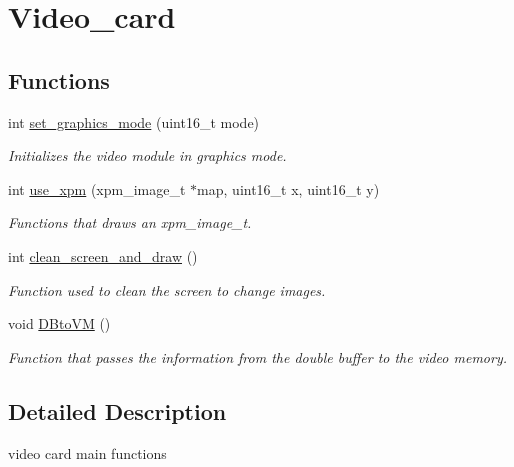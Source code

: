\hypertarget{group__video__card}{}\section{Video\+\_\+card}
\label{group__video__card}
\subsection*{Functions}
\begin{DoxyCompactItemize}
\item 
int \hyperlink{group__video__card_ga430711ee8dd8b9944c9393b6f333f48d}{set\+\_\+graphics\+\_\+mode} (uint16\+\_\+t mode)
\begin{DoxyCompactList}\small\item\em Initializes the video module in graphics mode. \end{DoxyCompactList}\item 
int \hyperlink{group__video__card_gacfacfc0ba6b20cfe99f211e93870bc4c}{use\+\_\+xpm} (xpm\+\_\+image\+\_\+t $\ast$map, uint16\+\_\+t x, uint16\+\_\+t y)
\begin{DoxyCompactList}\small\item\em Functions that draws an xpm\+\_\+image\+\_\+t. \end{DoxyCompactList}\item 
int \hyperlink{group__video__card_ga0b82755b321546975e5137f974c4ce3d}{clean\+\_\+screen\+\_\+and\+\_\+draw} ()
\begin{DoxyCompactList}\small\item\em Function used to clean the screen to change images. \end{DoxyCompactList}\item 
\mbox{\label{group__video__card_ga4f5703f9b121dc5e85673680a1082c7d}} 
void \hyperlink{group__video__card_ga4f5703f9b121dc5e85673680a1082c7d}{D\+Bto\+VM} ()
\begin{DoxyCompactList}\small\item\em Function that passes the information from the double buffer to the video memory. \end{DoxyCompactList}\end{DoxyCompactItemize}


\subsection{Detailed Description}
video card main functions 

